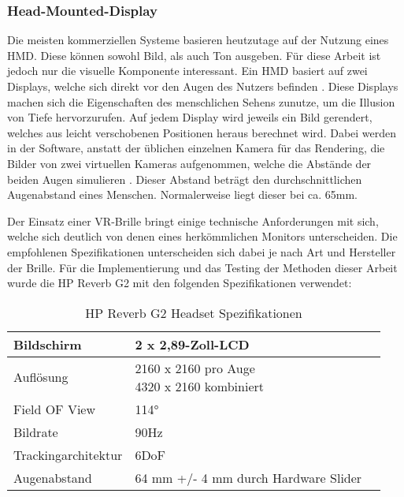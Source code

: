 \subsubsection{Head-Mounted-Display}
Die meisten kommerziellen Systeme basieren heutzutage auf der Nutzung eines HMD.
Diese können sowohl Bild, als auch Ton ausgeben. Für diese Arbeit ist jedoch nur die visuelle Komponente interessant.
Ein HMD basiert auf zwei Displays, welche sich direkt vor den Augen des Nutzers befinden \parencite{Sutherland1968}.
Diese Displays machen sich die Eigenschaften des menschlichen Sehens zunutze, um die Illusion von Tiefe hervorzurufen.
Auf jedem Display wird jeweils ein Bild gerendert, welches aus leicht verschobenen Positionen heraus berechnet wird.
Dabei werden in der Software, anstatt der üblichen einzelnen Kamera für das Rendering, die Bilder von zwei virtuellen Kameras aufgenommen,
welche die Abstände der beiden Augen simulieren \parencite{NVIDIA2010}. Dieser Abstand beträgt den durchschnittlichen
Augenabstand eines Menschen. Normalerweise liegt dieser bei ca. 65mm.

Der Einsatz einer VR-Brille bringt einige technische Anforderungen mit sich, welche sich deutlich
von denen eines herkömmlichen Monitors unterscheiden. Die empfohlenen Spezifikationen unterscheiden sich dabei je nach Art und
Hersteller der Brille. Für die Implementierung und das Testing der Methoden dieser Arbeit wurde die HP Reverb G2 mit den folgenden
Spezifikationen verwendet:


\begin{table}[!h]
	\renewcommand*{\arraystretch}{2}
	\setlength{\tabcolsep}{1.5cm}
	\begin{tabular}{lll}
		\hspace{-1.5cm}Bildschirm          & 2 x 2,89-Zoll-LCD                    \\ \hline
		\hspace{-1.5cm}Auflösung           & \makecell[l]{2160 x 2160 pro Auge    \\4320 x 2160 kombiniert}  \\ \hline
		\hspace{-1.5cm}Field OF View       & \raisebox{-0.6ex}{\~{ }}114°         \\ \hline
		\hspace{-1.5cm}Bildrate            & 90Hz                                 \\ \hline
		\hspace{-1.5cm}Trackingarchitektur & 6DoF                                 \\ \hline
		\hspace{-1.5cm}Augenabstand        & 64 mm +/- 4 mm durch Hardware Slider \\ \hline
	\end{tabular}
	\caption[Tabelle 1]{HP Reverb G2 Headset Spezifikationen \parencite{HPG2}}
\end{table}








